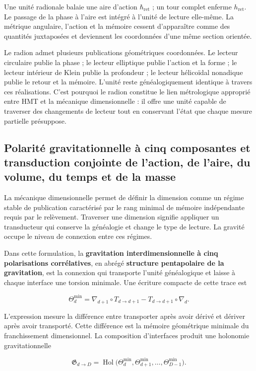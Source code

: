 Une unité radionale balaie une aire d'action \(\hbar_{\mathrm{ret}}\) ; un tour complet enferme \(h_{\mathrm{ret}}\). Le passage de la phase à l'aire est intégré à l'unité de lecture elle-même. La métrique angulaire, l'action et la mémoire cessent d'apparaître comme des quantités juxtaposées et deviennent les coordonnées d'une même section orientée.

Le radion admet plusieurs publications géométriques coordonnées. Le lecteur circulaire publie la phase ; le lecteur elliptique publie l'action et la forme ; le lecteur intérieur de Klein publie la profondeur ; le lecteur hélicoïdal nonadique publie le retour et la mémoire. L'unité reste généalogiquement identique à travers ces réalisations. C'est pourquoi le radion constitue le lien métrologique approprié entre HMT et la mécanique dimensionnelle : il offre une unité capable de traverser des changements de lecteur tout en conservant l'état que chaque mesure partielle présuppose.

\subsection{Polarité gravitationnelle à cinq composantes et transduction conjointe de l'action, de l'aire, du volume, du temps et de la masse}

La mécanique dimensionnelle permet de définir la dimension comme un régime stable de publication caractérisé par le rang minimal de mémoire indépendante requis par le relèvement. Traverser une dimension signifie appliquer un transducteur qui conserve la généalogie et change le type de lecture. La gravité occupe le niveau de connexion entre ces régimes.

Dans cette formulation, la \textbf{gravitation interdimensionnelle à cinq polarisations corrélatives}, en abrégé \textbf{structure pentapolaire de la gravitation}, est la connexion qui transporte l'unité généalogique et laisse à chaque interface une torsion minimale. Une écriture compacte de cette trace est

\[
\Theta_d^{\min}
=
\nabla_{d+1}\circ T_{d\to d+1}
-
T_{d\to d+1}\circ\nabla_d.
\]

L'expression mesure la différence entre transporter après avoir dérivé et dériver après avoir transporté. Cette différence est la mémoire géométrique minimale du franchissement dimensionnel. La composition d'interfaces produit une holonomie gravitationnelle

\[
\mathfrak G_{d\to D}
=
\operatorname{Hol}
\bigl(
\Theta_d^{\min},
\Theta_{d+1}^{\min},
\ldots,
\Theta_{D-1}^{\min}
\bigr).
\]

